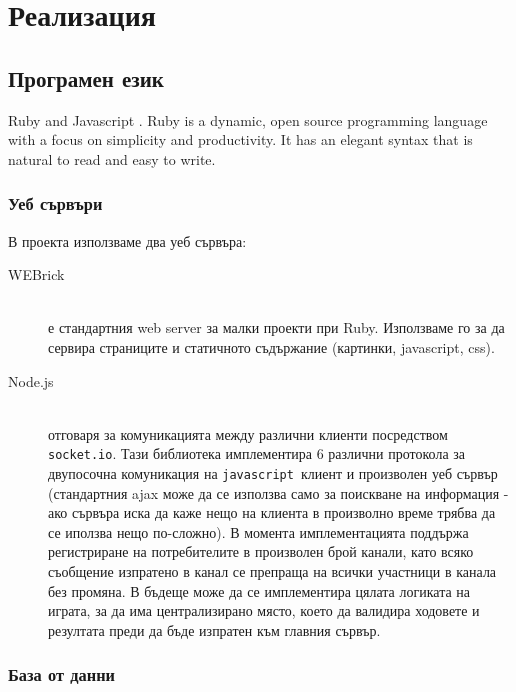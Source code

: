 \documentclass[a4paper]{article}
\def\js{\texttt{javascript}}
\begin{document}

\section{Реализация}

\subsection{Програмен език}

Ruby \cite{ruby} and Javascript \cite{javascript}.
Ruby is a dynamic, open source programming language with a focus on simplicity and productivity. It has an elegant syntax that is natural to read and easy to write.

\subsubsection{Уеб сървъри}

  В проекта използваме два уеб сървъра:
  \begin{description}
    \item[WEBrick] \hfill \\ е стандартния web server за малки проекти при Ruby. Използваме го за да сервира страниците и статичното съдържание (картинки, javascript, css).
    \item[Node.js] \hfill \\ отговаря за комуникацията между различни клиенти посредством \texttt{socket.io}. Тази библиотека имплементира 6 различни протокола за двупосочна комуникация на \js\ клиент и произволен уеб сървър (стандартния ajax може да се използва само за поискване на информация - ако сървъра иска да каже нещо на клиента в произволно време трябва да се иползва нещо по-сложно). В момента имплементацията поддържа регистриране на потребителите в произволен брой канали, като всяко съобщение изпратено в канал се препраща на всички участници в канала без промяна. В бъдеще може да се имплементира цялата логиката на играта, за да има централизирано място, което да валидира ходовете и резултата преди да бъде изпратен към главния сървър.
  \end{description}

\subsubsection{База от данни}
\end{document}
